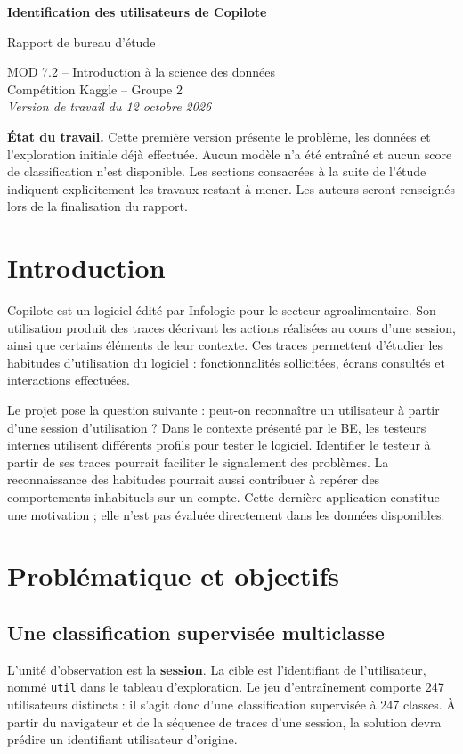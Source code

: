 \documentclass[10pt,a4paper]{article}
\begin{document}
\thispagestyle{plain}
\begin{center}
{\Large\bfseries\color{accent} Identification des utilisateurs de Copilote}\par
\vspace{0.35em}
{\large Rapport de bureau d'étude}\par
MOD 7.2 -- Introduction à la science des données\\
Compétition Kaggle -- Groupe 2\\[0.5em]
\textit{Version de travail du 12 octobre 2026}
\end{center}

\textbf{État du travail.} Cette première version présente le problème, les données
et l'exploration initiale déjà effectuée. Aucun modèle n'a été entraîné et aucun
score de classification n'est disponible. Les sections consacrées à la suite
de l'étude indiquent explicitement les travaux restant à mener. Les auteurs
seront renseignés lors de la finalisation du rapport.

\section{Introduction}
Copilote est un logiciel édité par Infologic pour le secteur agroalimentaire.
Son utilisation produit des traces décrivant les actions réalisées au cours
d'une session, ainsi que certains éléments de leur contexte. Ces traces
permettent d'étudier les habitudes d'utilisation du logiciel : fonctionnalités
sollicitées, écrans consultés et interactions effectuées.

Le projet pose la question suivante : peut-on reconnaître un utilisateur à
partir d'une session d'utilisation ? Dans le contexte présenté par le BE,
les testeurs internes utilisent différents profils pour tester le logiciel.
Identifier le testeur à partir de ses traces pourrait faciliter le signalement
des problèmes. La reconnaissance des habitudes pourrait aussi contribuer
à repérer des comportements inhabituels sur un compte. Cette dernière
application constitue une motivation ; elle n'est pas évaluée directement
dans les données disponibles.

\section{Problématique et objectifs}
\subsection{Une classification supervisée multiclasse}
L'unité d'observation est la \textbf{session}. La cible est l'identifiant de
l'utilisateur, nommé \texttt{util} dans le tableau d'exploration. Le jeu
d'entraînement comporte 247 utilisateurs distincts : il s'agit donc d'une
classification supervisée à 247 classes. À partir du navigateur et de la
séquence de traces d'une session, la solution devra prédire un identifiant
utilisateur d'origine.
\end{document}
